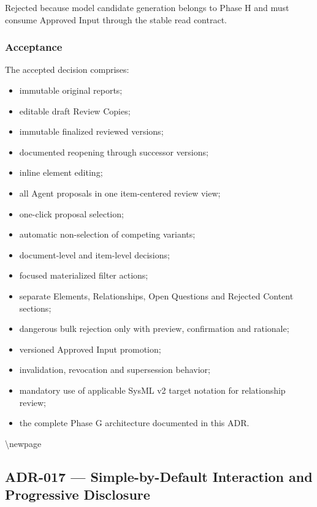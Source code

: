 Rejected because model candidate generation belongs to Phase H and must consume Approved Input through the stable read contract.

\hypertarget{acceptance}{%
\subsubsection{Acceptance}\label{acceptance}}

The accepted decision comprises:

\begin{itemize}
\tightlist
\item
  immutable original reports;
\item
  editable draft Review Copies;
\item
  immutable finalized reviewed versions;
\item
  documented reopening through successor versions;
\item
  inline element editing;
\item
  all Agent proposals in one item-centered review view;
\item
  one-click proposal selection;
\item
  automatic non-selection of competing variants;
\item
  document-level and item-level decisions;
\item
  focused materialized filter actions;
\item
  separate Elements, Relationships, Open Questions and Rejected Content sections;
\item
  dangerous bulk rejection only with preview, confirmation and rationale;
\item
  versioned Approved Input promotion;
\item
  invalidation, revocation and supersession behavior;
\item
  mandatory use of applicable SysML v2 target notation for relationship review;
\item
  the complete Phase G architecture documented in this ADR.
\end{itemize}

\textbackslash newpage

\hypertarget{adr-017--simple-by-default-interaction-and-progressive-disclosure}{%
\subsection{ADR-017 --- Simple-by-Default Interaction and Progressive Disclosure}\label{adr-017--simple-by-default-interaction-and-progressive-disclosure}}

